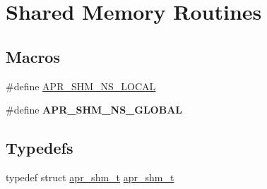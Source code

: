 \hypertarget{group__apr__shm}{\section{Shared Memory Routines}
\label{group__apr__shm}
}
\subsection*{Macros}
\begin{DoxyCompactItemize}
\item 
\#define \hyperlink{group__apr__shm_ga47cc28ddc5f32cf904383b9e4f82825b}{A\-P\-R\-\_\-\-S\-H\-M\-\_\-\-N\-S\-\_\-\-L\-O\-C\-A\-L}
\item 
\#define {\bfseries A\-P\-R\-\_\-\-S\-H\-M\-\_\-\-N\-S\-\_\-\-G\-L\-O\-B\-A\-L}
\end{DoxyCompactItemize}
\subsection*{Typedefs}
\begin{DoxyCompactItemize}
\item 
typedef struct \hyperlink{group__apr__shm_ga79e8c16bdeaf7ade4ef0f935249e7c2f}{apr\-\_\-shm\-\_\-t} \hyperlink{group__apr__shm_ga79e8c16bdeaf7ade4ef0f935249e7c2f}{apr\-\_\-shm\-\_\-t}
\end{DoxyCompactItemize}
